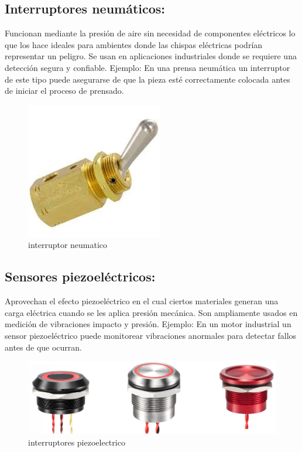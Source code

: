 \subsection{Interruptores neumáticos:}
Funcionan mediante la presión de aire sin necesidad de componentes eléctricos lo que los hace ideales para ambientes donde las chispas eléctricas podrían representar un peligro. Se usan en aplicaciones industriales donde se requiere una detección segura y confiable.
Ejemplo: En una prensa neumática un interruptor de este tipo puede asegurarse de que la pieza esté correctamente colocada antes de iniciar el proceso de prensado.

\begin{figure}[h]
	\centering
	\includegraphics[width=0.7\linewidth]{img/interruptor neumatico.jpg}
	\caption{interruptor neumatico}
	\label{fig:insertarimagen}
\end{figure}

\subsection{Sensores piezoeléctricos: }
Aprovechan el efecto piezoeléctrico en el cual ciertos materiales generan una carga eléctrica cuando se les aplica presión mecánica. Son ampliamente usados en medición de vibraciones impacto y presión.
Ejemplo: En un motor industrial un sensor piezoeléctrico puede monitorear vibraciones anormales para detectar fallos antes de que ocurran.


\begin{figure}[h]
	\centering
	\includegraphics[width=0.7\linewidth]{img/int piezoelectrico.png}
	\caption{interruptores piezoelectrico}
	\label{fig:insertarimagen}
\end{figure}

